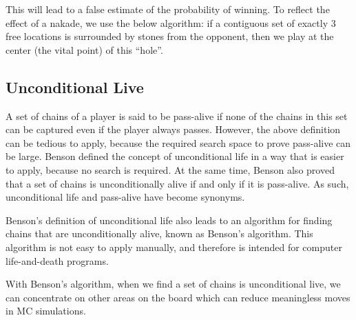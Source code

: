 This will lead to a false estimate of the probability of winning. To reflect the effect of a nakade, we use the below algorithm\cite{chaslot_combiningexpert}: if a contiguous set of exactly 3 free locations is surrounded by stones from the opponent, then we play at the center (the vital point) of this ``hole''.

\subsection{Unconditional Live}

A set of chains of a player is said to be pass-alive if none of the chains in this set can be captured even if the player always passes. However, the above definition can be tedious to apply, because the required search space to prove pass-alive can be large. Benson \cite{benson1976life} defined the concept of unconditional life in a way that is easier to apply, because no search is required. At the same time, Benson also proved that a set of chains is unconditionally alive if and only if it is pass-alive. As such, unconditional life and pass-alive have become synonyms.

Benson's definition of unconditional life also leads to an algorithm for finding chains that are unconditionally alive, known as Benson's algorithm. This algorithm is not easy to apply manually, and therefore is intended for computer life-and-death programs.

With Benson's algorithm, when we find a set of chains is unconditional live, we can concentrate on other areas on the board which can reduce meaningless moves in MC simulations. 